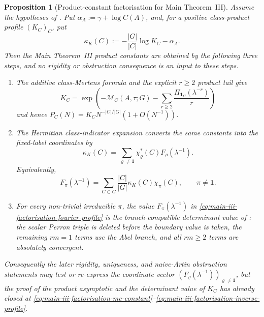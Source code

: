 \documentclass[11pt,a4paper]{amsart}
\theoremstyle{plain}
\newtheorem{proposition}[theorem]{Proposition}
\theoremstyle{definition}
\theoremstyle{remark}
\begin{document}
\begin{proposition}[Product-constant factorisation for Main Theorem~III]
  \label{prop:main-iii-product-constant-factorisation}
  Assume the hypotheses of .  Put
  \(\alpha_A:=\gamma+\log C(A)\), and, for a positive class-product profile
  \((K_C)_C\), put
  \[
    \kappa_K(C):=-\frac{|G|}{|C|}\log K_C-\alpha_A .
  \]
  Then the Main Theorem~III product constants are obtained by the following
  three steps, and no rigidity or obstruction consequence is an
  input to these steps.
  \begin{enumerate}
    \item The additive class-Mertens formula and the explicit \(r\ge2\)
    product tail give
    \begin{equation}\label{eq:main-iii-factorisation-mc-constant}
      K_C=
      \exp\!\left(
        -\mathcal M_C(A,\tau;G)
        -\sum_{r\ge2}\frac{\Pi_{\mathbf1_C}(\lambda^{-r})}{r}
      \right)
    \end{equation}
    and hence
    \(P_C(N)=K_CN^{-|C|/|G|}(1+O(N^{-1}))\).
    \item The Hermitian class-indicator expansion converts the same constants
    into the fixed-label coordinates by
    \begin{equation}\label{eq:main-iii-factorisation-fourier-profile}
      \kappa_K(C)=
      \sum_{\varrho\ne\mathbf1}
        \chi_\varrho^\ast(C)F_\varrho(\lambda^{-1}) .
    \end{equation}
    Equivalently,
    \begin{equation}\label{eq:main-iii-factorisation-inverse-profile}
      F_\pi(\lambda^{-1})=
      \sum_{C\subset G}\frac{|C|}{|G|}\kappa_K(C)\chi_\pi(C),
      \qquad \pi\ne\mathbf1 .
    \end{equation}
    \item For every non-trivial irreducible \(\pi\), the value
    \(F_\pi(\lambda^{-1})\) in \eqref{eq:main-iii-factorisation-fourier-profile} is
    the branch-compatible determinant value of
    : the scalar Perron triple is
    deleted before the boundary value is taken, the remaining \(rm=1\) terms
    use the Abel branch, and all \(rm\ge2\) terms are absolutely convergent.
  \end{enumerate}
  Consequently the later rigidity, uniqueness, and naive-Artin obstruction
  statements may test or re-express the coordinate vector
  \((F_\varrho(\lambda^{-1}))_{\varrho\ne\mathbf1}\), but the proof of the
  product asymptotic and the determinant value of \(K_C\) has already closed at
  \eqref{eq:main-iii-factorisation-mc-constant}--\eqref{eq:main-iii-factorisation-inverse-profile}.
\end{proposition}
\end{document}
